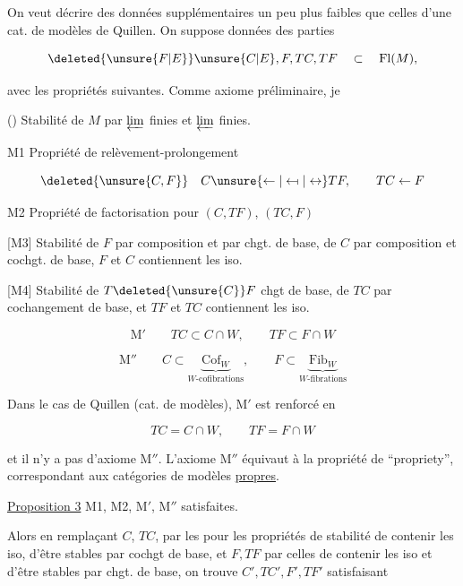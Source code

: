 
On veut décrire des données supplémentaires un peu plus faibles que celles d'une cat. de modèles de Quillen. On suppose données des parties

\[ \deleted{\unsure{F|E}}\unsure{C|E},F,TC,TF\quad\subset\quad\mathrm{Fl}(M), \]

avec les propriétés suivantes. Comme axiome préliminaire, je 

() Stabilité de $M$ par $\varprojlim$ finies et $\varprojlim$ finies.




M1 \quad Propriété de relèvement-prolongement

\[ \deleted{\unsure{C,F}} \quad C\unsure{\leftarrow|\leftarrow\!\shortmid|\leftrightarrow}TF,\qquad TC\leftarrow F \]

M2 \quad Propriété de factorisation pour $(C,TF)$, $(TC,F)$

[M3] \quad Stabilité de $F$ par composition et par chgt. de base, de $C$ par composition et cochgt. de base,  $F$ et $C$ contiennent les iso.

[M4] \quad Stabilité de $T\deleted{\unsure{C}}F$   chgt de base, de $TC$ par  cochangement de base, et $TF$ et $TC$ contiennent les iso.

\[ \mathrm M'\qquad TC\subset C\cap W,\qquad TF\subset F\cap W \]

\[ \mathrm M''\qquad C\subset\underbrace{\mathrm{Cof}_W}_{W\text{-cofibrations}},\qquad F\subset\underbrace{\mathrm{Fib}_W}_{W\text{-fibrations}} \]

Dans le cas de Quillen (cat. de modèles), M$'$ est renforcé en

\[ TC=C\cap W,\qquad TF=F\cap W \]

et il n'y a pas d'axiome M$''$. L'axiome M$''$ équivaut à la propriété de ``propriety'',  correspondant aux catégories de modèles \uline{propres}.

\uline{Proposition 3}   M1, M2, M$'$, M$''$ satisfaites.

Alors en remplaçant $C$,  $TC$,  par les  pour les propriétés de stabilité de contenir les iso,  d'être stables par  cochgt de base,  et $F,TF$ par celles de contenir les iso et d'être stables par  chgt. de base, on trouve  $C',TC',F',TF'$ satisfaisant

